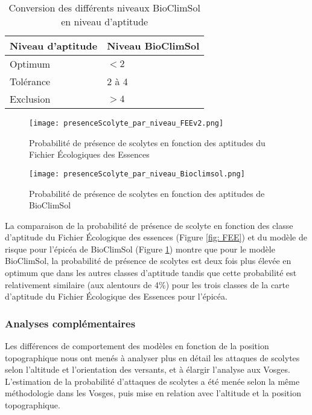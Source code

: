 \begin{table}[htbp]
	\caption{Conversion des différents niveaux BioClimSol en niveau d'aptitude}
	\label{tab: level}
	\begin{tabular}{|l|l|}
		\hline
		Niveau d'aptitude & Niveau BioClimSol \\ \hline
		Optimum           & $<2$            \\ \hline
		Tolérance         & 2 à 4          \\ \hline
		
		Exclusion         &  $>4$   \\ \hline
	\end{tabular}
	
\end{table}
\begin{figure}[htbp]
	\begin{minipage}[b]{1 \linewidth}
		\centering
		\texttt{[image: presenceScolyte\_par\_niveau\_FEEv2.png]}
		\caption{Probabilité de présence de scolytes en fonction des aptitudes du Fichier Écologiques des Essences }
		\label{fig: FEE}
		
	\end{minipage}\hfill
	\vspace{2cm}
	\begin{minipage}[b]{1 \linewidth}
		\centering
		\texttt{[image: presenceScolyte\_par\_niveau\_Bioclimsol.png]}
		\caption{Probabilité de présence de scolytes en fonction des aptitudes de BioClimSol}
		\label{fig: apt_2}
	\end{minipage}
\end{figure}

La comparaison de la probabilité de présence de scolyte en fonction des classe d’aptitude du Fichier Écologique des essences (Figure \ref{fig: FEE}) et du modèle de risque pour l'épicéa de BioClimSol (Figure \ref{fig: apt_2}) montre que pour le modèle BioClimSol, la probabilité de présence de scolytes est deux fois plus élevée en optimum que dans les autres classes d’aptitude tandis que cette probabilité est relativement similaire (aux alentours de 4\%) pour les trois classes de la carte d'aptitude du Fichier Écologique des Essences pour l'épicéa.

\subsubsection{Analyses complémentaires}
Les différences de comportement des modèles en fonction de la position topographique nous ont menés à analyser plus en détail les attaques de scolytes selon l'altitude et l'orientation des versants, et à élargir l'analyse aux Vosges. L'estimation de la probabilité d'attaques de scolytes a été menée selon la même méthodologie dans les Vosges, puis mise en relation avec l'altitude et la position topographique.\\

